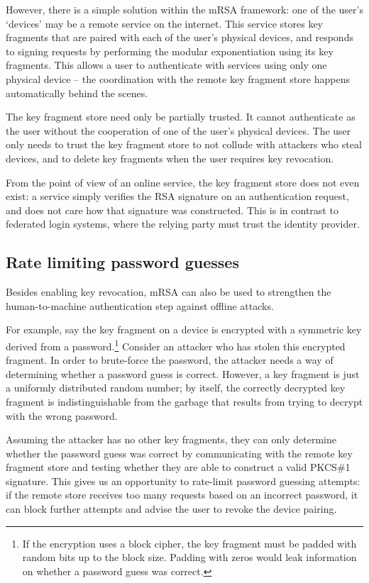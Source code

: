 However, there is a simple solution within the mRSA framework: one of the user's `devices' may be a
remote service on the internet. This service stores key fragments that are paired with each of the
user's physical devices, and responds to signing requests by performing the modular exponentiation
using its key fragments. This allows a user to authenticate with services using only one physical
device -- the coordination with the remote key fragment store happens automatically behind the
scenes.

The key fragment store need only be partially trusted. It cannot authenticate as the user without
the cooperation of one of the user's physical devices. The user only needs to trust the key fragment
store to not collude with attackers who steal devices, and to delete key fragments when the user
requires key revocation.

From the point of view of an online service, the key fragment store does not even exist: a service
simply verifies the RSA signature on an authentication request, and does not care how that signature
was constructed. This is in contrast to federated login systems, where the relying party must trust
the identity provider.

\subsection{Rate limiting password guesses}

Besides enabling key revocation, mRSA can also be used to strengthen the human-to-machine
authentication step against offline attacks.

For example, say the key fragment on a device is encrypted with a symmetric key derived from a
password.\footnote{If the encryption uses a block cipher, the key fragment must be padded with
random bits up to the block size. Padding with zeros would leak information on whether a password
guess was correct.} Consider an attacker who has stolen this encrypted fragment. In order to
brute-force the password, the attacker needs a way of determining whether a password guess is
correct. However, a key fragment is just a uniformly distributed random number; by itself, the
correctly decrypted key fragment is indistinguishable from the garbage that results from trying to
decrypt with the wrong password.

Assuming the attacker has no other key fragments, they can only determine whether the password guess
was correct by communicating with the remote key fragment store and testing whether they are able to
construct a valid PKCS\#1 signature. This gives us an opportunity to rate-limit password guessing
attempts: if the remote store receives too many requests based on an incorrect password, it can
block further attempts and advise the user to revoke the device pairing.

